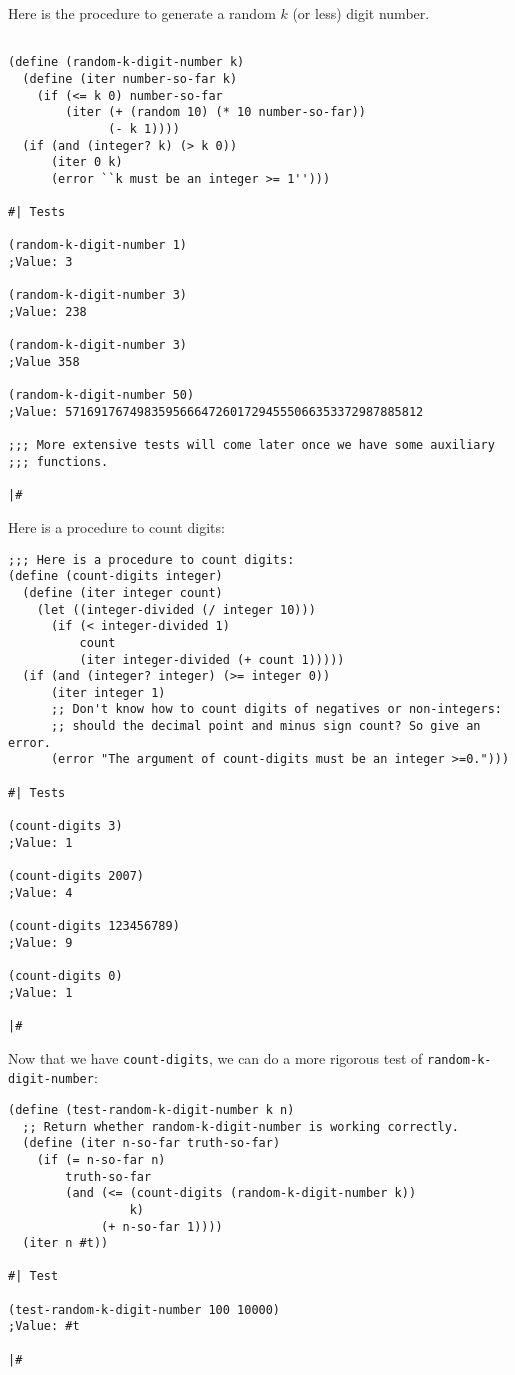 \documentclass[12pt]{article}
\begin{document}
Here is the procedure to generate a random $k$ (or less) digit number.

\begin{verbatim}

(define (random-k-digit-number k)
  (define (iter number-so-far k)
    (if (<= k 0) number-so-far
        (iter (+ (random 10) (* 10 number-so-far))
              (- k 1))))
  (if (and (integer? k) (> k 0))
      (iter 0 k)
      (error ``k must be an integer >= 1'')))

#| Tests

(random-k-digit-number 1)
;Value: 3

(random-k-digit-number 3)
;Value: 238

(random-k-digit-number 3)
;Value 358

(random-k-digit-number 50)
;Value: 57169176749835956664726017294555066353372987885812

;;; More extensive tests will come later once we have some auxiliary
;;; functions.

|#
\end{verbatim}

Here is a procedure to count digits:

\begin{verbatim}
;;; Here is a procedure to count digits:
(define (count-digits integer)
  (define (iter integer count)
    (let ((integer-divided (/ integer 10)))
      (if (< integer-divided 1)
          count
          (iter integer-divided (+ count 1)))))
  (if (and (integer? integer) (>= integer 0))
      (iter integer 1)
      ;; Don't know how to count digits of negatives or non-integers:
      ;; should the decimal point and minus sign count? So give an
error.
      (error "The argument of count-digits must be an integer >=0.")))

#| Tests

(count-digits 3)
;Value: 1

(count-digits 2007)
;Value: 4

(count-digits 123456789)
;Value: 9

(count-digits 0)
;Value: 1

|#

\end{verbatim}

Now that we have \texttt{count-digits}, we can do a more rigorous test
of \texttt{random-k-digit-number}:

\begin{verbatim}
(define (test-random-k-digit-number k n)
  ;; Return whether random-k-digit-number is working correctly.
  (define (iter n-so-far truth-so-far)
    (if (= n-so-far n)
        truth-so-far
        (and (<= (count-digits (random-k-digit-number k))
                 k)
             (+ n-so-far 1))))
  (iter n #t))

#| Test

(test-random-k-digit-number 100 10000)
;Value: #t

|#
\end{verbatim}
\end{document}
